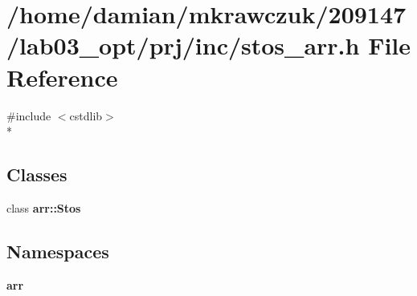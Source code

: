 \section{/home/damian/mkrawczuk/209147/lab03\-\_\-opt/prj/inc/stos\-\_\-arr.h File Reference}
\label{stos__arr_8h}
{\ttfamily \#include $<$cstdlib$>$}\\*
\subsection*{Classes}
\begin{DoxyCompactItemize}
\item 
class {\bf arr\-::\-Stos}
\end{DoxyCompactItemize}
\subsection*{Namespaces}
\begin{DoxyCompactItemize}
\item 
{\bf arr}
\end{DoxyCompactItemize}
